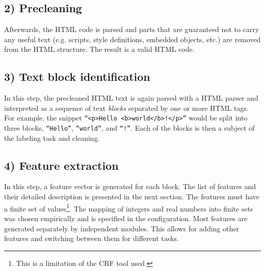 \documentclass[12pt,a4paper, fleqn, leqno, twoside]{article}
\newcommand{\mysubsection}[1]{\subsection*{\bf #1}}
\begin{document}
\mysubsection{2) Precleaning}

Afterwards, the HTML code is parsed  and parts that are guaranteed not to carry any useful text (e.g. scripts, style definitions, embedded objects, etc.) are removed from the HTML structure. The result is a valid HTML code.

\mysubsection{3) Text block identification}
\enlargethispage{2mm}


In this step, the precleaned HTML text is again parsed with a HTML parser and interpreted as a sequence of text \textit{blocks} separated by one or more HTML tags. For example, the snippet
        {\tt ``<p>Hello <b>world</b>!</p>''}
would be split into three blocks, {\tt ``Hello''}, {\tt ``world''}, and {\tt ``!''}.  Each of the blocks is then a subject of the labeling task and cleaning.


\mysubsection{4) Feature extraction}

In this step, a feature vector is generated for each block. The list of features and their detailed description is presented in the next section. The features must have a finite set of values\footnote{This is a limitation of the CRF tool used.}. The mapping of integers and real numbers into finite sets was chosen empirically and is specified in the configuration.
%  
% 
Most features are generated separately by independent modules. This allows for adding other features and switching between them for different tasks.
\end{document}
